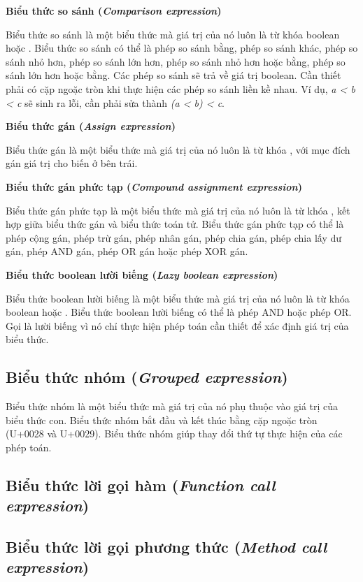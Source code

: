 \noindent\textbf{Biểu thức so sánh (\textit{Comparison expression})}

\regexcompexpr

Biểu thức so sánh là một biểu thức mà giá trị của nó luôn là từ khóa boolean  hoặc . Biểu thức so sánh có thể là phép so sánh bằng, phép so sánh khác, phép so sánh nhỏ hơn, phép so sánh lớn hơn, phép so sánh nhỏ hơn hoặc bằng, phép so sánh lớn hơn hoặc bằng. Các phép so sánh sẽ trả về giá trị boolean. Cần thiết phải có cặp ngoặc tròn khi thực hiện các phép so sánh liền kề nhau. Ví dụ, \textit{a < b < c} sẽ sinh ra lỗi, cần phải sửa thành \textit{(a < b) < c}.

\noindent\textbf{Biểu thức gán (\textit{Assign expression})}

\regexassignexpr

Biểu thức gán là một biểu thức mà giá trị của nó luôn là từ khóa , với mục đích gán giá trị cho biến ở bên trái.

\noindent\textbf{Biểu thức gán phức tạp (\textit{Compound assignment expression})}

\regexcompoundassignexpr

Biểu thức gán phức tạp là một biểu thức mà giá trị của nó luôn là từ khóa , kết hợp giữa biểu thức gán và biểu thức toán tử. Biểu thức gán phức tạp có thể là phép cộng gán, phép trừ gán, phép nhân gán, phép chia gán, phép chia lấy dư gán, phép AND gán, phép OR gán hoặc phép XOR gán.

\noindent\textbf{Biểu thức boolean lười biếng (\textit{Lazy boolean expression})}

\regexlazyboolexpr

Biểu thức boolean lười biếng là một biểu thức mà giá trị của nó luôn là từ khóa boolean  hoặc . Biểu thức boolean lười biếng có thể là phép AND hoặc phép OR. Gọi là lười biếng vì nó chỉ thực hiện phép toán cần thiết để xác định giá trị của biểu thức.

\subsection{Biểu thức nhóm (\textit{Grouped expression})}

\regexgroupexpr

Biểu thức nhóm là một biểu thức mà giá trị của nó phụ thuộc vào giá trị của biểu thức con. Biểu thức nhóm bắt đầu và kết thúc bằng cặp ngoặc tròn (U+0028 và U+0029). Biểu thức nhóm giúp thay đổi thứ tự thực hiện của các phép toán.

\subsection{Biểu thức lời gọi hàm (\textit{Function call expression})}

\subsection{Biểu thức lời gọi phương thức (\textit{Method call expression})}
